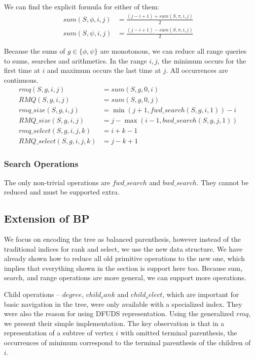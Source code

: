 We can find the explicit formula for either of them:
\begin{align*}
	sum(S, \phi, i, j) &= \frac{(j - i + 1) + sum(S, \pi, i, j)}{2} \\
	sum(S, \psi, i, j) &= \frac{(j - i + 1) - sum(S, \pi, i, j)}{2}
\end{align*}

Because the sums of $g \in \{\phi, \psi \}$ are monotonous, we can reduce all range queries to sums, searches and arithmetics.
In the range $i, j$, the minimum occurs for the first time at $i$ and maximum occurs the last time at $j$.
All occurrences are continuous.
\begin{align*}
	rmq(S, g, i, j) &= sum(S, g, 0, i) \\
	RMQ(S, g, i, j) &= sum(S, g, 0, j) \\
	rmq\_size(S, g, i, j) &= \min(j + 1, fwd\_search(S, g, i, 1)) - i \\
	RMQ\_size(S, g, i, j) &= j - \max(i - 1, bwd\_search(S, g, j, 1)) \\
	rmq\_select(S, g, i, j, k) &= i + k - 1 \\ 
	RMQ\_select(S, g, i, j, k) &= j - k + 1
\end{align*}

\subsubsection{Search Operations}

The only non-trivial operations are $fwd\_search$ and $bwd\_search$.
They cannot be reduced and must be supported extra.


\subsection{Extension of BP}

We focus on encoding the tree as balanced parenthesis, however instead of the traditional indices for rank and select, we use the new data structure.
We have already shown how to reduce all old primitive operations to the new one, which implies that everything shown in the section  is support here too.
Because sum, search, and range operations are more general, we can support more operations.

Child operations -- $degree$, $child_rank$ and $child_select$, which are important for basic navigation in the tree, were only available with a specialized index.
They were also the reason for using DFUDS representation.
Using the generalized $rmq$, we present their simple implementation.
The key observation is that in a representation of a subtree of vertex $i$ with omitted terminal parenthesis, the occurrences of minimum correspond to the terminal parenthesis of the children of $i$.

